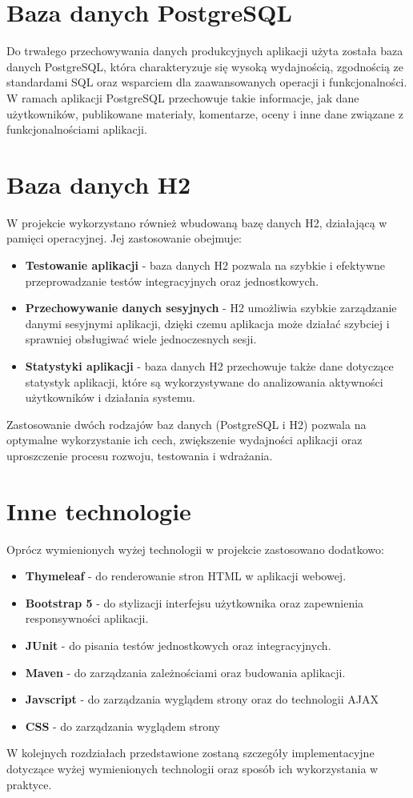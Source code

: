 \section{Baza danych PostgreSQL}

Do trwałego przechowywania danych produkcyjnych aplikacji użyta została baza danych PostgreSQL, która charakteryzuje się wysoką wydajnością, zgodnością ze standardami SQL oraz wsparciem dla zaawansowanych operacji i funkcjonalności. W ramach aplikacji PostgreSQL przechowuje takie informacje, jak dane użytkowników, publikowane materiały, komentarze, oceny i inne dane związane z funkcjonalnościami aplikacji.

\section{Baza danych H2}

W projekcie wykorzystano również wbudowaną bazę danych H2, działającą w pamięci operacyjnej. Jej zastosowanie obejmuje:
\begin{itemize}
    \item \textbf{Testowanie aplikacji} - baza danych H2 pozwala na szybkie i efektywne przeprowadzanie testów integracyjnych oraz jednostkowych.
    \item \textbf{Przechowywanie danych sesyjnych} - H2 umożliwia szybkie zarządzanie danymi sesyjnymi aplikacji, dzięki czemu aplikacja może działać szybciej i sprawniej obsługiwać wiele jednoczesnych sesji.
    \item \textbf{Statystyki aplikacji} - baza danych H2 przechowuje także dane dotyczące statystyk aplikacji, które są wykorzystywane do analizowania aktywności użytkowników i działania systemu.
\end{itemize}

Zastosowanie dwóch rodzajów baz danych (PostgreSQL i H2) pozwala na optymalne wykorzystanie ich cech, zwiększenie wydajności aplikacji oraz uproszczenie procesu rozwoju, testowania i wdrażania.

\section{Inne technologie}

Oprócz wymienionych wyżej technologii w projekcie zastosowano dodatkowo:
\begin{itemize}
    \item \textbf{Thymeleaf} - do renderowanie stron HTML w aplikacji webowej.
    \item \textbf{Bootstrap 5} - do stylizacji interfejsu użytkownika oraz zapewnienia responsywności aplikacji.
    \item \textbf{JUnit} - do pisania testów jednostkowych oraz integracyjnych.
    \item \textbf{Maven} - do zarządzania zależnościami oraz budowania aplikacji.
    \item \textbf{Javscript} - do zarządzania wyglądem strony oraz do technologii AJAX
    \item \textbf{CSS} - do zarządzania wyglądem strony
\end{itemize}

W kolejnych rozdziałach przedstawione zostaną szczegóły implementacyjne dotyczące wyżej wymienionych technologii oraz sposób ich wykorzystania w praktyce.





